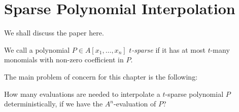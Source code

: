 \chapter{Sparse Polynomial Interpolation}
\label{ch:benor-tiwari}

We shall discuss the paper \cite{ben-or-tiwari} here.

\begin{definition}
    We call a polynomial $P\in A[x_1,\ldots,x_n]$ \emph{$t$-sparse} if it has at most $t$-many monomials with non-zero coefficient in $P$.
\end{definition}

The main problem of concern for this chapter is the following:

\begin{blackbox}
    \begin{problem}
           How many evaluations are needed to interpolate a $t$-sparse polynomial $P$ deterministically, if we have the $A^n$-evaluation of $P$?
    \end{problem}
\end{blackbox}